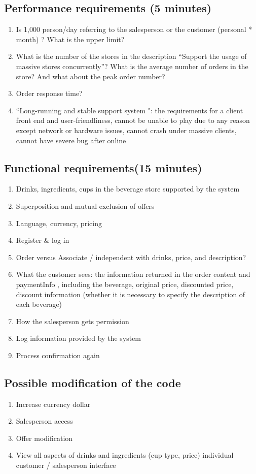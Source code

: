 \documentclass[a4paper]{report}
\begin{document}
 \subsection{Performance requirements (5 minutes)}
 \begin{enumerate}
\item Is 1,000 person/day referring to the salesperson or the customer (personal * month) ? What is the upper limit? 
\item What is the number of the stores in the description ``Support the usage of massive stores concurrently''?  What is the average number of orders in the store? And what about the peak order number? 
\item Order response time? 
\item ``Long-running and stable support system ": the requirements for a client front end and user-friendliness, cannot be unable to play due to any reason except network or hardware issues, cannot crash under massive clients, cannot have severe bug after online
\end{enumerate}
\subsection{Functional requirements(15 minutes)}
\begin{enumerate}
\item Drinks, ingredients, cups in the beverage store supported by the system 
\item Superposition and mutual exclusion of offers 
\item Language, currency, pricing 
\item Register \& log in 
\item Order versus Associate / independent with drinks, price, and description?
\item What the customer sees: the information returned in the order content and paymentInfo , including the beverage, original price, discounted price, discount information (whether it is necessary to specify the description of each beverage) 
\item How the salesperson gets permission 
\item Log information provided by the system 
\item Process confirmation again
\end{enumerate}
\subsection{Possible modification of the code}
\begin{enumerate}
\item Increase currency dollar 
\item Salesperson access 
\item Offer modification 
\item View all aspects of drinks and ingredients (cup type, price) individual customer / salesperson interface 
\end{enumerate}
\end{document}
